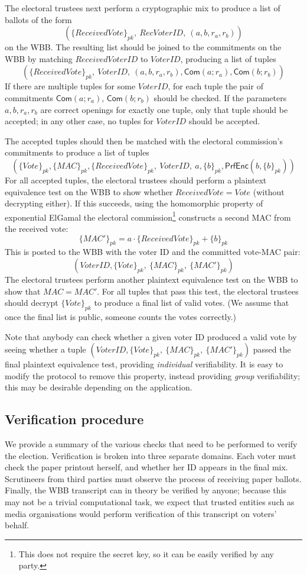 \documentclass[12pt,a4paper]{article}
\newcommand{\commit}{\mathsf{Com}}
\newcommand{\PrfEnc}{\mathsf{PrfEnc}}
\theoremstyle{definition}
\newcommand{\Vote}{\mathit{Vote}}
\newcommand{\VoterID}{\mathit{VoterID}}
\newcommand{\receivedvid}{\mathit{RecVoterID}}
\newcommand{\Mac}{\mathit{MAC}}
\begin{document}
The electoral trustees next perform a cryptographic mix to produce a list of ballots of the form
$$\left(\{ReceivedVote\}_{pk},\ \receivedvid,\ (a,b,r_a,r_b)\right)$$
on the WBB. The resulting list should be joined to the commitments on the WBB by matching $ReceivedVoterID$ to $\VoterID$, producing a list of tuples
$$\left(\{ReceivedVote\}_{pk},\ \VoterID,\ (a,b,r_a,r_b), \commit(a;r_a), \commit(b;r_b)\right)$$
If there are multiple tuples for some $\VoterID$, for each tuple the pair of commitments $\commit(a;r_a)$, $\commit(b;r_b)$ should be checked. If the parameters $a,b,r_a,r_b$ are correct openings for exactly one tuple, only that tuple should be accepted; in any other case, no tuples for $\VoterID$ should be accepted.

The accepted tuples should then be matched with the electoral commission's commitments to produce a list of tuples
$$\left(\{\Vote\}_{pk},\{\Mac\}_{pk}, \{ReceivedVote\}_{pk},\ \VoterID,\ a, \{b\}_{pk}, \PrfEnc(b, \{b\}_{pk})\right)$$
For all accepted tuples, the electoral trustees should perform a plaintext equivalence test on the WBB to show whether $ReceivedVote=\Vote$ (without decrypting either). If this succeeds, using the homomorphic property of exponential ElGamal the electoral commission\footnote{This does not require the secret key, so it can be easily verified by any party.} constructs a second MAC from the received vote:
$$\{\Mac'\}_{pk}=a\cdot\{ReceivedVote\}_{pk}+\{b\}_{pk}$$
This is posted to the WBB with the voter ID and the committed vote-MAC pair:
$$\left(\VoterID, \{\Vote\}_{pk},\ \{\Mac\}_{pk},\ \{\Mac'\}_{pk}\right)$$
The electoral trustees perform another plaintext equivalence test on the WBB to show that $\Mac=\Mac'$. For all tuples that pass this test, the electoral trustees should decrypt $\{\Vote\}_{pk}$ to produce a final list of valid votes. (We assume that once the final list is public, someone counts the votes correctly.)

Note that anybody can check whether a given voter ID produced a valid vote by seeing whether a tuple $\left(\VoterID, \{\Vote\}_{pk},\ \{\Mac\}_{pk},\ \{\Mac'\}_{pk}\right)$ passed the final plaintext equivalence test, providing \textit{individual} verifiability. It is easy to modify the protocol to remove this property, instead providing \textit{group} verifiability; this may be desirable depending on the application.
\subsection{Verification procedure}
We provide a summary of the various checks that need to be performed to verify the election. Verification is broken into three separate domains. Each voter must check the paper printout herself, and whether her ID appears in the final mix. Scrutineers from third parties must observe the process of receiving paper ballots. Finally, the WBB transcript can in theory be verified by anyone; because this may not be a trivial computational task, we expect that trusted entities such as media organisations would perform verification of this transcript on voters' behalf.
\end{document}
